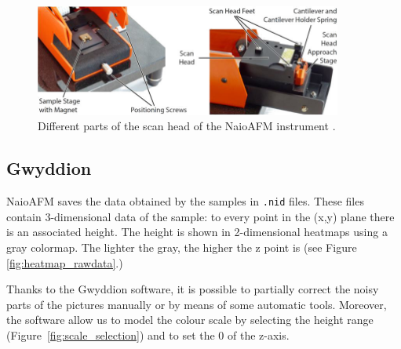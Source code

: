 \documentclass[11pt,a4paper]{article}
\begin{document}
\begin{figure}[hbt]
\centering
\includegraphics[width=0.9\textwidth]{naioafm2}
\caption{Different parts of the scan head of the NaioAFM instrument \cite{NaioAFM}.}
\label{fig:naioafm}
\end{figure}

\subsection{Gwyddion}

NaioAFM saves the data obtained by the samples in \texttt{.nid} files. These files contain 3-dimensional data of the sample: to every point in the (x,y) plane there is an associated height. The height is shown in 2-dimensional heatmaps using a gray colormap. The lighter the gray, the higher the z point is (see Figure \ref{fig:heatmap_rawdata}.)

Thanks to the Gwyddion software, it is possible to partially correct the noisy parts of the pictures manually or by means of some automatic tools. Moreover, the software allow us to model the colour scale by selecting the height range (Figure~\ref{fig:scale_selection}) and to set the 0 of the z-axis.
\end{document}
